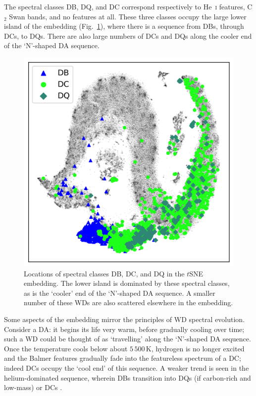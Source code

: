 \documentclass[fleqn,usenatbib]{rasti}
\begin{document}
The spectral classes DB, DQ, and DC correspond respectively to He~\textsc{i} features, C$_2$ Swan bands, and no features at all.
These three classes occupy the large lower island of the embedding (Fig.~\ref{fig:DBCQ}), where there is a sequence from DBs, through DCs, to DQs.
There are also large numbers of DCs and DQs along the cooler end of the `N'-shaped DA sequence.

\begin{figure}
\centering
\includegraphics[width=\columnwidth]{figures/fig5_DBCQ.png}
\caption{
    Locations of spectral classes DB, DC, and DQ in the $t$SNE embedding.
    The lower island is dominated by these spectral classes, as is the `cooler' end of the `N'-shaped DA sequence.
    A smaller number of these WDs are also scattered elsewhere in the embedding.
}
\label{fig:DBCQ}
\end{figure}

Some aspects of the embedding mirror the principles of WD spectral evolution.
Consider a DA: it begins its life very warm, before gradually cooling over time; such a WD could be thought of as `travelling' along the `N'-shaped DA sequence.
Once the temperature cools below about $5\,500\,\text{K}$, hydrogen is no longer excited and the Balmer features gradually fade into the featureless spectrum of a DC; indeed DCs occupy the `cool end' of this sequence.
A weaker trend is seen in the helium-dominated sequence, wherein DBs transition into DQs (if carbon-rich and low-mass) or DCs \citep[e.g.][]{bedard24}.
\end{document}
